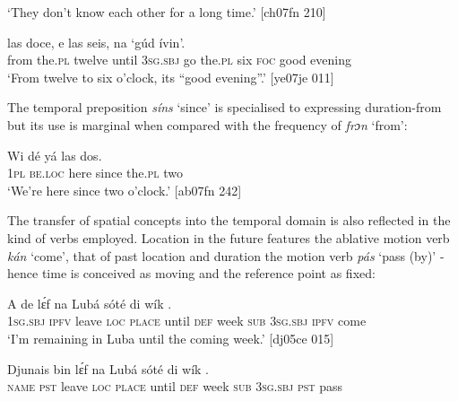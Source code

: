\glt ‘They don’t know each other for a long time.’ [ch07fn 210]
\z


\ea%
    \label{ex:key:1031}
    \gll {}  las    doce,      e      las    seis,
na  ‘gúd    ívin’.\\
from  the.\textsc{pl}  twelve  until  \textsc{3sg.sbj}  go  the.\textsc{pl}  six  
\textsc{foc}  good  evening\\

\glt ‘From twelve to six o’clock, its “good evening”.’ [ye07je 011]
\z

The temporal preposition \textit{síns} ‘since’ is specialised to expressing duration-from but its use is marginal when compared with the frequency of \textit{frɔn} ‘from’: 


\ea%
    \label{ex:key:1032}
    \gll Wi  dé    yá        las    dos.\\
\textsc{1pl}  \textsc{be.loc}  here    since  the.\textsc{pl}  two\\

\glt ‘We’re here since two o’clock.’ [ab07fn 242]
\z

The transfer of spatial concepts into the temporal domain is also reflected in the kind of verbs employed. Location in the future features the ablative motion verb \textit{kán} ‘come’, that of past location and duration the motion verb \textit{pás} ‘pass (by)’ - hence time is conceived as moving and the reference point as fixed:


\ea%
    \label{ex:key:1033}
    \gll A    de  lɛ́f    na  Lubá  sóté    di  wík
        .\\
\textsc{1sg.sbj}  \textsc{ipfv}  leave  \textsc{loc}  \textsc{place}  until  \textsc{def}  week
\textsc{sub}  \textsc{3sg.sbj}  \textsc{ipfv}  come\\

\glt ‘I’m remaining in Luba until the coming week.’ [dj05ce 015]
\z


\ea%
    \label{ex:key:1034}
    \gll Djunais  bin  lɛ́f    na  Lubá  sóté    di  wík
        .\\
\textsc{name}  \textsc{pst}  leave  \textsc{loc}  \textsc{place}  until  \textsc{def}  week
\textsc{sub}  \textsc{3sg.sbj}  \textsc{pst}  pass\\

